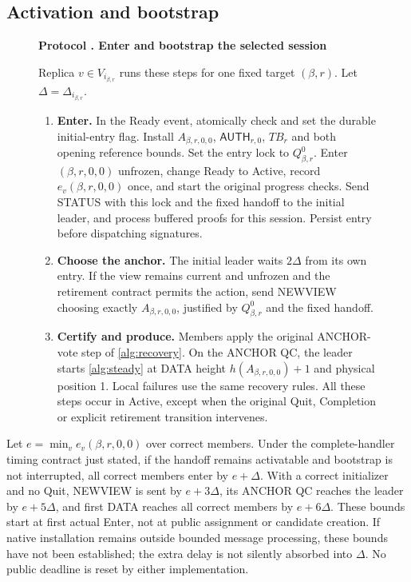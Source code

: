\documentclass[11pt,a4paper]{article}
\newcommand{\TB}{\mathit{TB}}
\newcommand{\tagg}[1]{\ensuremath{\mathsf{#1}}}
\newcounter{protocol}
\newenvironment{protocol}[3][htbp]{\begin{figure}[#1]\refstepcounter{protocol}\label{#2}
\begin{mdframed}[linewidth=.6pt,skipabove=0pt,skipbelow=0pt,
innertopmargin=7pt,innerbottommargin=7pt]\small
\textbf{Protocol \theprotocol. #3}\par\smallskip}{\end{mdframed}\end{figure}}
\begin{document}
\subsection{Activation and bootstrap}
\label{sec:ready}
\begin{protocol}[H]{alg:bootstrap}{Enter and bootstrap the selected session}
Replica $v\in V_{i_{\beta,r}}$ runs these steps for one fixed target
$(\beta,r)$. Let $\Delta=\Delta_{i_{\beta,r}}$.
\begin{enumerate}[label=\textbf{\arabic*)},itemsep=3pt]
\item \textbf{Enter.} In the Ready event, atomically check and set
the durable initial-entry flag. Install $A_{\beta,r,0,0}$,
$\tagg{AUTH}_{r,0}$, $\TB_r$ and both opening reference bounds.
Set the entry lock to $Q^0_{\beta,r}$. Enter $(\beta,r,0,0)$
unfrozen, change Ready to Active, record $e_v(\beta,r,0,0)$ once,
and start the original progress checks. Send STATUS with this lock
and the fixed handoff to the initial leader, and process buffered
proofs for this session. Persist entry before dispatching signatures.
\item \textbf{Choose the anchor.} The initial leader waits
$2\Delta$ from its own entry. If the view remains current and
unfrozen and the retirement contract permits the action, send NEWVIEW
choosing exactly $A_{\beta,r,0,0}$, justified by $Q^0_{\beta,r}$
and the fixed handoff.
\item \textbf{Certify and produce.} Members apply the original
ANCHOR-vote step of \cref{alg:recovery}. On the ANCHOR QC, the leader
starts \cref{alg:steady} at DATA height $h(A_{\beta,r,0,0})+1$
and physical position 1. Local failures use the same recovery rules.
All these steps occur in Active, except when the original Quit,
Completion or explicit retirement transition intervenes.
\end{enumerate}
\end{protocol}

Let $e=\min_v e_v(\beta,r,0,0)$ over correct members. Under the
complete-handler timing contract just stated, if the handoff remains
activatable and bootstrap is not interrupted, all correct members enter
by $e+\Delta$. With a correct initializer and no Quit, NEWVIEW is sent
by $e+3\Delta$, its ANCHOR QC reaches the leader by $e+5\Delta$, and
first DATA reaches all correct members by $e+6\Delta$. These bounds
start at first actual Enter, not at public assignment or candidate creation.
If native installation remains outside bounded message processing, these
bounds have not been established; the extra delay is not silently absorbed
into $\Delta$. No public deadline is reset by either implementation.
\end{document}
